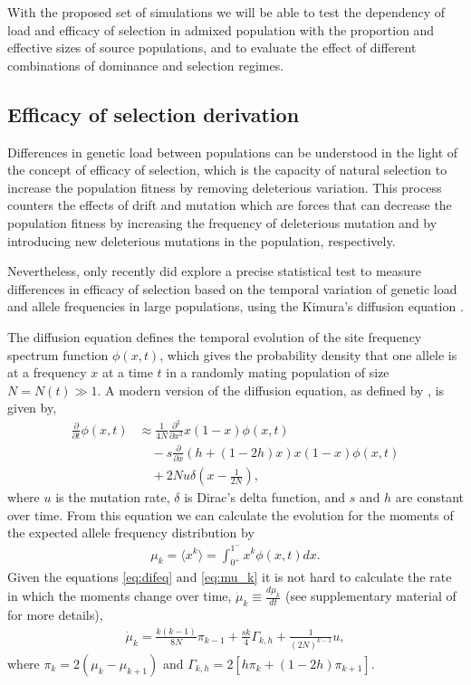 \documentclass[a4paper, 12pt]{article}
\begin{document}
With the proposed set of simulations we will be able to test the dependency of
load and efficacy of selection in admixed population with the proportion and
effective sizes of source populations, and to evaluate the effect of different
combinations of dominance and selection regimes. 


\subsection{Efficacy of selection derivation}
\label{sec:fit}

Differences in genetic load between populations can be understood in the light
of the concept of efficacy of selection, which is the capacity of natural
selection to increase the population fitness by removing deleterious variation.
This process counters the effects of drift and mutation which are forces that
can decrease the population fitness by increasing the frequency of deleterious
mutation and by introducing new deleterious mutations in the population,
respectively.

Nevertheless, only recently did \cite{Gravel2016} explore a precise
statistical test to measure differences in efficacy of selection based on the
temporal variation of genetic load and allele frequencies in large populations,
using the Kimura's diffusion equation \citep{Kimura1955,Kimura1955a}. 

The diffusion equation defines the temporal evolution of the site frequency
spectrum function $\phi(x,t)$, which gives the probability density that one
allele is at a frequency $x$ at a time $t$ in a randomly mating population of
size $N = N(t) \gg 1$. A modern version of the diffusion equation, as defined
by \cite{Ewens2004}, is given by,
\begin{align}
\label{eq:difeq}
\frac{\partial}{\partial t} \phi(x,t) & \approx 
\frac{1}{4N}\frac{\partial^2}{\partial x^2} 
x (1 - x) \phi(x,t) \\ \nonumber
& \quad -s\frac{\partial}{\partial x} 
(h + ( 1 - 2 h)x)
x (1 - x) \phi(x,t) \\ \nonumber
& \quad + 2 N u \delta(x - \frac{1}{2N}),
\end{align}
where $u$ is the mutation rate, $\delta$ is Dirac's delta function, and $s$
and $h$ are constant over time. From this equation we can calculate the
evolution for the moments of the expected allele frequency distribution by 
\begin{align}
	\mu_k = \langle x^k \rangle = \int_{0^+}^{1^-}x^k \phi(x,t)dx.
	\label{eq:mu_k}
\end{align}
Given the equations \eqref{eq:difeq} and \eqref{eq:mu_k} it is not hard to
calculate the rate in which the moments change over time, $\dot \mu_k \equiv
\frac{d \mu_k}{ dt}$ (see supplementary material of \cite{Gravel2016} for more
details),
\begin{align}
	\label{eq:dmu_k}
	\dot \mu_k = \frac{k(k-1)}{8N} \pi_{k-1} + \frac{sk}{4}\Gamma_{k,h} + \frac{1}{(2N)^{k-1}}u,
\end{align}
where $\pi_k = 2(\mu_k - \mu_{k+1})$ and $\Gamma_{k,h} = 2[h\pi_k + (1 - 2h)\pi_{k+1}]$.
\end{document}
